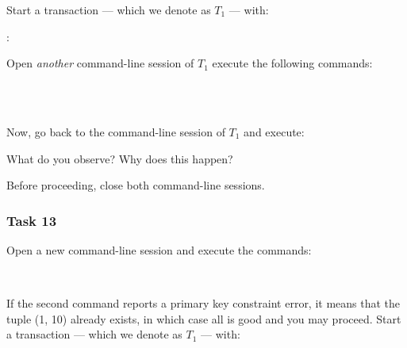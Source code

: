 \noindent Start a transaction --- which we denote as $T_1$ --- with:

\vgap

\noindent {}

\vgap

\noindent {}:

\vgap

\noindent {}

\vgap

\noindent Open {\em another} command-line session of $T_1$ execute the following commands:

\vgap

\noindent {}  \\
\noindent {}  \\
\noindent {}

\vgap

\noindent Now, go back to the command-line session of $T_1$ and execute:

\vgap

\noindent {}

\vgap

\noindent What do you observe? Why does this happen?

\vgap

\noindent Before proceeding, close both command-line sessions.


\subsubsection{Task 13}

Open a new command-line session and execute the commands:

\vgap

\noindent {} \\
\noindent {}

\vgap

\noindent If the second command reports a primary key constraint error, it means that the tuple (1, 10) already exists, in which case all is good and you may proceed. Start a transaction --- which we denote as $T_1$ --- with:

\vgap

\noindent {}

